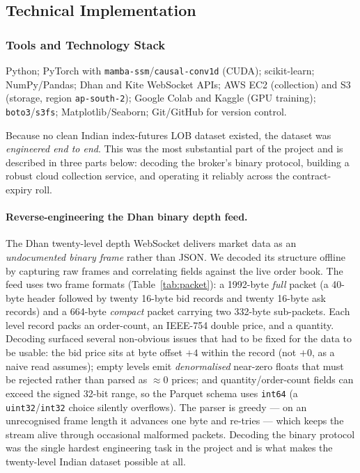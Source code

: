 \documentclass[11pt]{article}
\begin{document}
\subsection{Technical Implementation}
\subsubsection{Tools and Technology Stack}
Python; PyTorch with \texttt{mamba-ssm}/\texttt{causal-conv1d} (CUDA); scikit-learn; NumPy/Pandas; Dhan and
Kite WebSocket APIs; AWS EC2 (collection) and S3 (storage, region \texttt{ap-south-2}); Google Colab and
Kaggle (GPU training); \texttt{boto3}/\texttt{s3fs}; Matplotlib/Seaborn; Git/GitHub for version control.

Because no clean Indian index-futures LOB dataset existed, the dataset was \emph{engineered end to end}.
This was the most substantial part of the project and is described in three parts below: decoding the
broker's binary protocol, building a robust cloud collection service, and operating it reliably across the
contract-expiry roll.

\paragraph{Reverse-engineering the Dhan binary depth feed.}
The Dhan twenty-level depth WebSocket delivers market data as an \emph{undocumented binary frame} rather than
JSON. We decoded its structure offline by capturing raw frames and correlating fields against the live order
book. The feed uses two frame formats (Table~\ref{tab:packet}): a 1992-byte \emph{full} packet (a 40-byte
header followed by twenty 16-byte bid records and twenty 16-byte ask records) and a 664-byte \emph{compact}
packet carrying two 332-byte sub-packets. Each level record packs an order-count, an IEEE-754 double price,
and a quantity. Decoding surfaced several non-obvious issues that had to be fixed for the data to be usable:
the bid price sits at byte offset $+4$ within the record (not $+0$, as a naive read assumes); empty levels
emit \emph{denormalised} near-zero floats that must be rejected rather than parsed as $\approx 0$ prices; and
quantity/order-count fields can exceed the signed 32-bit range, so the Parquet schema uses \texttt{int64}
(a \texttt{uint32}/\texttt{int32} choice silently overflows). The parser is greedy --- on an unrecognised
frame length it advances one byte and re-tries --- which keeps the stream alive through occasional
malformed packets. Decoding the binary protocol was the single hardest engineering task in the project and
is what makes the twenty-level Indian dataset possible at all.
\end{document}
